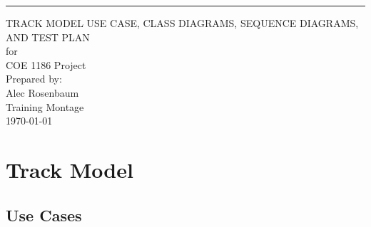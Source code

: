 \documentclass{scrreprt}
\begin{document}
\begin{flushright}
    \rule{16cm}{5pt}\vskip1cm
    \begin{bfseries}
        \Huge{TRACK MODEL USE CASE, CLASS DIAGRAMS, SEQUENCE DIAGRAMS, AND TEST PLAN}\\
        \vspace{.9cm}
        for\\
        \vspace{.9cm}
        COE 1186 Project\\
        \vspace{.9cm}
        \vspace{.9cm}
        Prepared by:\\
        Alec Rosenbaum\\
        \vspace{3.9cm}
        Training Montage\\
        \vspace{.9cm}
        \today\\
    \end{bfseries}
\end{flushright}

\tableofcontents

\chapter{Track Model}

\section{Use Cases}
\end{document}
